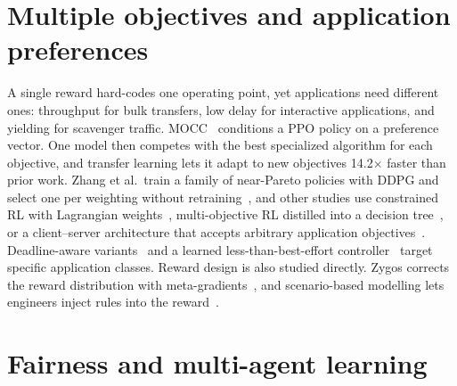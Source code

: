\section{Multiple objectives and application preferences}
\label{sec:multiobjective}

A single reward hard-codes one operating point, yet applications need different ones: throughput for bulk transfers, low delay for interactive applications, and yielding for scavenger traffic. MOCC~\cite{ma2022mocc} conditions a PPO policy on a preference vector. One model then competes with the best specialized algorithm for each objective, and transfer learning lets it adapt to new objectives 14.2$\times$ faster than prior work. Zhang et al.\ train a family of near-Pareto policies with DDPG and select one per weighting without retraining~\cite{zhang2022deepcc}, and other studies use constrained RL with Lagrangian weights~\cite{liu2021multi}, multi-objective RL distilled into a decision tree~\cite{liu2025adaptive}, or a client--server architecture that accepts arbitrary application objectives~\cite{xing2025reinforcement}. Deadline-aware variants~\cite{liao2021learning,liao2023stop} and a learned less-than-best-effort controller~\cite{tang2023combining} target specific application classes. Reward design is also studied directly. Zygos corrects the reward distribution with meta-gradients~\cite{liu2024zygos}, and scenario-based modelling lets engineers inject rules into the reward~\cite{yerushalmi2023enhancing}.

\section{Fairness and multi-agent learning}
\label{sec:fairness}

